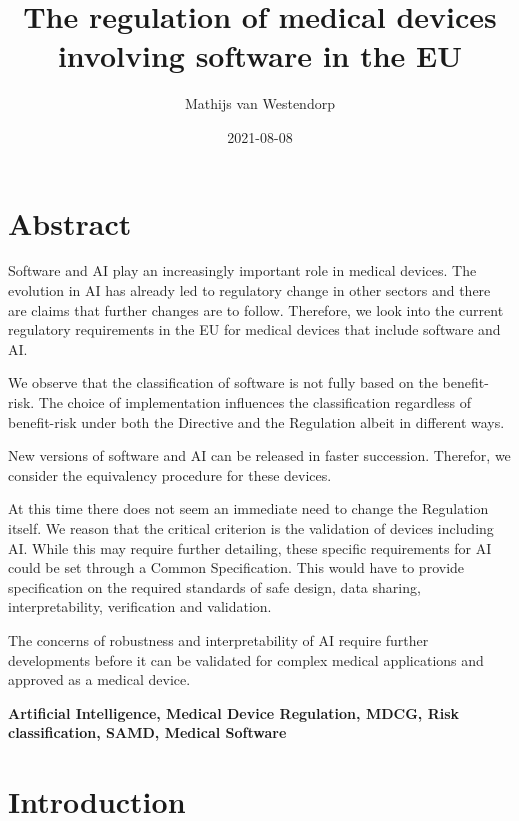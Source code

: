 \documentclass[
]{scrartcl}
\title{The regulation of medical devices involving software in the EU}
\author{Mathijs van Westendorp}
\date{2021-08-08}
\begin{document}
\maketitle

{
\setcounter{tocdepth}{2}
\tableofcontents
}
\hypertarget{abstract}{%
\section*{Abstract}\label{abstract}}

Software and AI play an increasingly important role in medical devices. The evolution in AI has already led to regulatory change in other sectors and there are claims that further changes are to follow. Therefore, we look into the current regulatory requirements in the EU for medical devices that include software and AI.

We observe that the classification of software is not fully based on the benefit-risk. The choice of implementation influences the classification regardless of benefit-risk under both the Directive and the Regulation albeit in different ways.

New versions of software and AI can be released in faster succession. Therefor, we consider the equivalency procedure for these devices.

At this time there does not seem an immediate need to change the Regulation itself. We reason that the critical criterion is the validation of devices including AI. While this may require further detailing, these specific requirements for AI could be set through a Common Specification. This would have to provide specification on the required standards of safe design, data sharing, interpretability, verification and validation.

The concerns of robustness and interpretability of AI require further developments before it can be validated for complex medical applications and approved as a medical device.

\textbf{Artificial Intelligence, Medical Device Regulation, MDCG, Risk classification, SAMD, Medical Software}

\hypertarget{introduction}{%
\section{Introduction}\label{introduction}}
\end{document}
